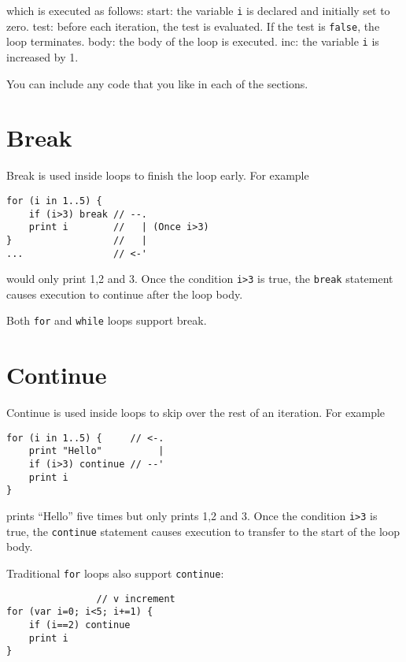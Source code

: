 which is executed as follows: start: the variable \texttt{i} is declared
and initially set to zero. test: before each iteration, the test is
evaluated. If the test is \texttt{false}, the loop terminates. body: the
body of the loop is executed. inc: the variable \texttt{i} is increased
by 1.

You can include any code that you like in each of the sections.

\hypertarget{break}{%
\section{Break}\label{break}}

Break is used inside loops to finish the loop early. For example

\begin{lstlisting}
for (i in 1..5) {
    if (i>3) break // --.
    print i        //   | (Once i>3)
}                  //   |
...                // <-'
\end{lstlisting}

would only print 1,2 and 3. Once the condition \texttt{i\textgreater{}3}
is true, the \texttt{break} statement causes execution to continue after
the loop body.

Both \texttt{for} and \texttt{while} loops support break.

\hypertarget{continue}{%
\section{Continue}\label{continue}}

Continue is used inside loops to skip over the rest of an iteration. For
example

\begin{lstlisting}
for (i in 1..5) {     // <-.
    print "Hello"          |
    if (i>3) continue // --'
    print i
}                     
\end{lstlisting}

prints ``Hello'' five times but only prints 1,2 and 3. Once the
condition \texttt{i\textgreater{}3} is true, the \texttt{continue}
statement causes execution to transfer to the start of the loop body.

Traditional \texttt{for} loops also support \texttt{continue}:

\begin{lstlisting}
                // v increment
for (var i=0; i<5; i+=1) {
    if (i==2) continue
    print i
}
\end{lstlisting}

